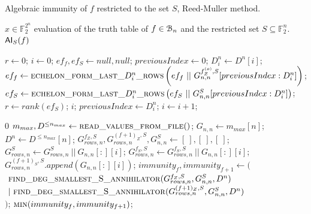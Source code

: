 \documentclass[11pt]{llncs}
\begin{document}
\begin{algorithm}\label{alg:RMApproach}
	\caption{Algebraic immunity of $f$ restricted to the set $S$, Reed-Muller method.}
	\begin{algorithmic}[1]
		\Require $x\in \mathbb{F}_2^{2^n}$ evaluation of the truth table of $f\in \mathcal{B}_{n}$ and the restricted set $S\subseteq \mathbb{F}_2^n$.
		\Ensure $\mathsf{AI}_S(f)$
		
		\State $r \gets 0$;
		\State $i \gets 0$;
		\State $ef_f, ef_S \gets null, null$;
		\State $previousIndex \gets 0$;
		\State $D_i^n \gets D^n[i]$;
		\State $ef_f\gets \mbox{\textsc{echelon\_form\_last\_}}D_i^n\mbox{\textsc{\_rows}}\left(ef_f\ ||\  G_{n,n}^{f_Z^{(o)},S}[previousIndex:D_i^n]\right)$\footnotemark;
		\State $ef_S \gets \mbox{\textsc{echelon\_form\_last\_}}D_i^n\mbox{\textsc{\_rows}}\left(ef_S\ ||\ G_{n,n}^S[previousIndex:D_i^n]\right)$;
		\State $r \gets rank\left(ef_S\right)$;
		\State
		\Return $i$;
		\EndIf
		\State $previousIndex \gets D_i^n$;
		\State $i \gets i+1$;
		\EndWhile
		\EndFunction
		\State
		
		\Return $0$
		\EndIf
		\State $m_{max}, D^{\leq n_{max}}\gets \mbox{\textsc{read\_values\_from\_file}}()$;
		\State $G_{n,n}\gets m_{max}[n]$;
		\State $D^n \gets D^{\leq n_{max}}[n]$;
		\State $G_{rows,n}^{f_Z,S}, G_{rows,n}^{(f+ 1)_Z,S}, G_{n,n}^S \gets [\ ], [\ ], [\ ]$;
		\State $G_{rows,n}^{S} \gets G_{rows,n}^{S}\ ||\ G_{n,n}[:][i]$;
		\State $G_{rows,n}^{f_S,S} \gets G_{rows,n}^{f_S,S}\ ||\ G_{n,n}[:][i]$;
		\Else
		\State $G_{rows,n}^{(f+ 1)_S,S}.append\left(G_{n,n}[:][i]\right)$;
		\EndIf
		\EndIf
		\EndFor
		\State $immunity_f, immunity_{f+1} \leftarrow ($\\
		$\ \mbox{\textsc{find\_deg\_smallest\_S\_annihilator}}(G_{rows,n}^{f_Z,S}, G_{n,n}^S,D^{n})$\\
		$\ |\ \mbox{\textsc{find\_deg\_smallest\_S\_annihilator}}(G_{rows,n}^{(f+ 1)_Z,S}, G_{n,n}^S, D^{n})$\\
		$)$;
		\State \Return $\mbox{\textsc{min}}(immunity_f, immunity_{f+1})$\footnotemark;
	\end{algorithmic}
\end{algorithm}
\end{document}
